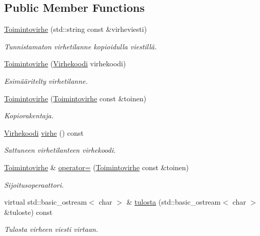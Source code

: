 \subsection*{Public Member Functions}
\begin{DoxyCompactItemize}
\item 
\hyperlink{class_julkinen_1_1_toimintovirhe_a12dc9116cfc155a3d945f67849d40ba4}{Toimintovirhe} (std\+::string const \&virheviesti)
\begin{DoxyCompactList}\small\item\em Tunnistamaton virhetilanne kopioidulla viestillä. \end{DoxyCompactList}\item 
\hyperlink{class_julkinen_1_1_toimintovirhe_a28d01593d11341bf3fe02963757a6eec}{Toimintovirhe} (\hyperlink{class_julkinen_1_1_toimintovirhe_a5b3c981a2e64a397ac982787bf310a2c}{Virhekoodi} virhekoodi)
\begin{DoxyCompactList}\small\item\em Esimääritelty virhetilanne. \end{DoxyCompactList}\item 
\hyperlink{class_julkinen_1_1_toimintovirhe_a2299cc89c62d178eb4e510b3223b681d}{Toimintovirhe} (\hyperlink{class_julkinen_1_1_toimintovirhe}{Toimintovirhe} const \&toinen)
\begin{DoxyCompactList}\small\item\em Kopiorakentaja. \end{DoxyCompactList}\item 
\hyperlink{class_julkinen_1_1_toimintovirhe_a5b3c981a2e64a397ac982787bf310a2c}{Virhekoodi} \hyperlink{class_julkinen_1_1_toimintovirhe_a4c95cc57f943ee89a4a7cdcbe6236f55}{virhe} () const 
\begin{DoxyCompactList}\small\item\em Sattuneen virhetilanteen virhekoodi. \end{DoxyCompactList}\item 
\hyperlink{class_julkinen_1_1_toimintovirhe}{Toimintovirhe} \& \hyperlink{class_julkinen_1_1_toimintovirhe_aa0db68b7505f9ed596aaa473ef98caf6}{operator=} (\hyperlink{class_julkinen_1_1_toimintovirhe}{Toimintovirhe} const \&toinen)
\begin{DoxyCompactList}\small\item\em Sijoitusoperaattori. \end{DoxyCompactList}\item 
virtual std\+::basic\+\_\+ostream$<$ char $>$ \& \hyperlink{class_julkinen_1_1_toimintovirhe_a6a3078478f0bbf08821d0d5357df2c6a}{tulosta} (std\+::basic\+\_\+ostream$<$ char $>$ \&tuloste) const 
\begin{DoxyCompactList}\small\item\em Tulosta virheen viesti virtaan. \end{DoxyCompactList}\end{DoxyCompactItemize}
